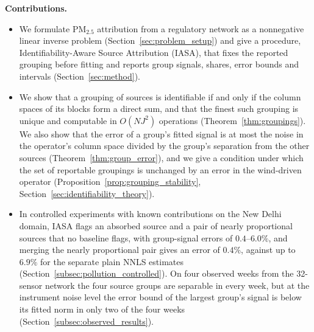\noindent\textbf{Contributions.}
\begin{itemize}[leftmargin=*,itemsep=0pt,topsep=0pt]
  \item We formulate PM\(_{2.5}\) attribution from a regulatory network as a nonnegative
  linear inverse problem (Section~\ref{sec:problem_setup}) and give a procedure,
  Identifiability-Aware Source Attribution (IASA), that fixes the reported grouping
  before fitting and reports group signals, shares, error bounds and intervals
  (Section~\ref{sec:method}).
  \item We show that a grouping of sources is identifiable if and only if the column
  spaces of its blocks form a direct sum, and that the finest such grouping is unique
  and computable in \(O(NJ^2)\) operations (Theorem~\ref{thm:groupings}).  We also show
  that the error of a group's fitted signal is at most the noise in the operator's
  column space divided by the group's separation from the other sources
  (Theorem~\ref{thm:group_error}), and we give a condition under which the set of
  reportable groupings is unchanged by an error in the wind-driven operator
  (Proposition~\ref{prop:grouping_stability}, Section~\ref{sec:identifiability_theory}).
  \item In controlled experiments with known contributions on the New Delhi domain,
  IASA flags an absorbed source and a pair of nearly proportional sources that no
  baseline flags, with group-signal errors of \(0.4\)--\(6.0\%\), and merging the nearly
  proportional pair gives an error of \(0.4\%\), against up to \(6.9\%\) for the separate
  plain NNLS estimates
  (Section~\ref{subsec:pollution_controlled}).  On four observed weeks from the
  32-sensor network the four source groups are separable in every week, but at the
  instrument noise level the error bound of the largest group's signal is below its
  fitted norm in only two of the four weeks
  (Section~\ref{subsec:observed_results}).
\end{itemize}
